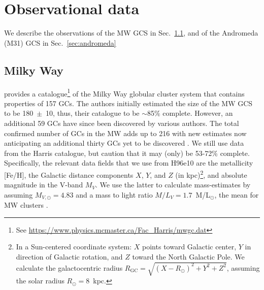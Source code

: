 \documentclass[a4paper,fleqn,usenatbib]{mnras}
\begin{document}
%


\section{Observational data}
\label{sec:observations}
We describe the observations of the MW GCS in Sec.~\ref{sec:milkyway},
and of the Andromeda (M31) GCS in Sec.~\ref{sec:andromeda}


\subsection{Milky Way}
\label{sec:milkyway}
\citet[][2010 edition; hereafter H96e10]{1996AJ....112.1487H} provides a
catalogue\footnote{See \url{https://www.physics.mcmaster.ca/Fac_Harris/mwgc.dat}}
of the Milky Way globular cluster system that contains properties of
157 GCs. The authors initially estimated the size of the MW GCS to be 180~$\pm$~10,
thus, their catalogue to be $\sim$85\% complete. However, an additional 59 GCs
have since been discovered by various authors. The total confirmed number of GCs
in the MW adds up to 216 with new estimates now anticipating an additional thirty
GCs yet to be discovered \citep[e.g.][and references therein]{2018ApJ...863L..38R}.
We still use data from the Harris catalogue, but caution that it may (only) be
53-72\% complete. Specifically, the relevant data fields that we use from H96e10
are the metallicity [Fe/H], the Galactic distance components $X$, $Y$, and $Z$ (in
kpc)\footnote{In a Sun-centered coordinate system: $X$ points toward Galactic
center, $Y$ in direction of Galactic rotation, and $Z$ toward the North Galactic
Pole. We calculate the galactocentric radius $R_{\text{GC}}=\sqrt{(X-R_\odot)^2
+ Y^2 + Z^2}$, assuming the solar radius $R_\odot=8$~kpc.}, and absolute
magnitude in the V-band $M_V$. We use the latter to calculate mass-estimates by
assuming $M_{V,\odot}=4.83$ and a mass to light ratio $M/L_V = 1.7$~M/L$_{\odot}$,
the mean for MW clusters \citep{2005ApJS..161..304M}.

\end{document}
